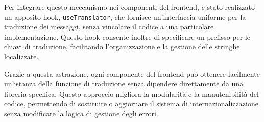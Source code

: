Per integrare questo meccanismo nei componenti del frontend, è stato realizzato un apposito hook, \texttt{useTranslator}, che fornisce un'interfaccia uniforme per la traduzione dei messaggi, senza vincolare il codice a una particolare implementazione. Questo hook consente inoltre di specificare un prefisso per le chiavi di traduzione, facilitando l'organizzazione e la gestione delle stringhe localizzate.



Grazie a questa astrazione, ogni componente del frontend può ottenere facilmente un’istanza della funzione di traduzione senza dipendere direttamente da una libreria specifica. Questo approccio migliora la modularità e la manutenibilità del codice, permettendo di sostituire o aggiornare il sistema di internazionalizzazione senza modificare la logica di gestione degli errori.

